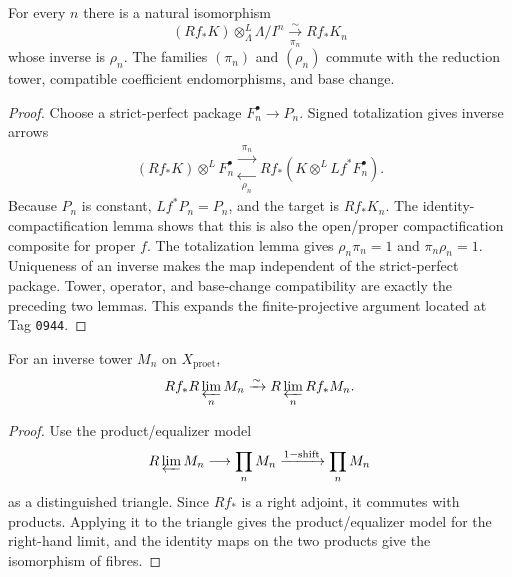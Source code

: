 \begin{lemma}
\label{lemma:weil-pbc-perfect-projection-formula}
For every $n$ there is a natural isomorphism
\[
 (Rf_*K)\otimes^L_\Lambda\Lambda/I^n
 \xrightarrow[\pi_n]{\sim}Rf_*K_n
\]
whose inverse is $\rho_n$.  The families $(\pi_n)$ and $(\rho_n)$ commute
with the reduction tower, compatible coefficient endomorphisms, and base
change.
\end{lemma}
\begin{proof}

Choose a strict-perfect package $F_n^\bullet\to P_n$.  Signed totalization
gives inverse arrows
\[
 (Rf_*K)\otimes^LF_n^\bullet
 \mathrel{\substack{\xrightarrow{\ \pi_n\ }\\[-2pt]
 \xleftarrow[\ \rho_n\ ]{}}}
 Rf_*(K\otimes^LLf^*F_n^\bullet).
\]
Because $P_n$ is constant, $Lf^*P_n=P_n$, and the target is $Rf_*K_n$.
The identity-compactification lemma shows that this is also the open/proper
compactification composite for proper $f$.  The totalization lemma gives
$\rho_n\pi_n=1$ and $\pi_n\rho_n=1$.  Uniqueness of an inverse makes the map
independent of the strict-perfect package.  Tower, operator, and base-change
compatibility are exactly the preceding two lemmas.  This expands the
finite-projective argument located at Tag \texttt{0944}.
\end{proof}

\begin{lemma}
\label{lemma:weil-pbc-direct-image-r-lim}
\uses{}
For an inverse tower $M_n$ on $X_{\mathrm{proet}}$,
\[
 Rf_*R\varprojlim_nM_n\xrightarrow{\sim}
 R\varprojlim_nRf_*M_n.
\]
\end{lemma}
\begin{proof}
Use the product/equalizer model
\[
 R\varprojlim M_n\longrightarrow\prod_nM_n
 \xrightarrow{1-\mathrm{shift}}\prod_nM_n
\]
as a distinguished triangle.  Since $Rf_*$ is a right adjoint, it commutes
with products.  Applying it to the triangle gives the product/equalizer model
for the right-hand limit, and the identity maps on the two products give the
isomorphism of fibres.
\end{proof}


